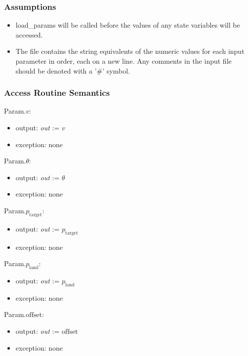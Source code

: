 \documentclass[12pt, titlepage]{article}
\begin{document}
\subsubsection{Assumptions}

\begin{itemize}

\item load\_params will be called before the values of any state variables will 
be accessed.

\item The file contains the string equivalents of the numeric values for
each input parameter in order, each on a new line. Any comments in the input file 
should be denoted with a '\#' symbol.

\end{itemize}

\subsubsection{Access Routine Semantics}

\noindent Param.$v$:
\begin{itemize}
\item output: \textit{out} := $v$
\item exception: none
\end{itemize}

\noindent Param.$\theta$:
\begin{itemize}
\item output: \textit{out} := $\theta$
\item exception: none
\end{itemize}

\noindent Param.$p_{\text{target}}$:
\begin{itemize}
\item output: \textit{out} := $p_{\text{target}}$
\item exception: none
\end{itemize}

\noindent Param.$p_{\text{land}}$:
\begin{itemize}
\item output: \textit{out} := $p_{\text{land}}$
\item exception: none
\end{itemize}

\noindent Param.$\text{offset}$:
\begin{itemize}
\item output: \textit{out} := $\text{offset}$
\item exception: none
\end{itemize}
\end{document}
